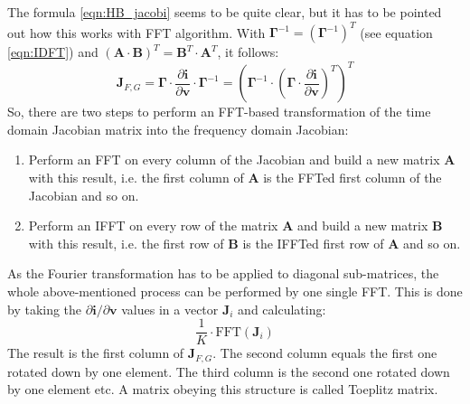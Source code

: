 The formula \ref{eqn:HB_jacobi} seems to be quite clear, but it has to be pointed out how
this works with FFT algorithm. With
$\boldsymbol{\Gamma}^{-1} = (\boldsymbol{\Gamma}^{-1})^T$
(see equation \ref{eqn:IDFT}) and
$(\boldsymbol{A}\cdot\boldsymbol{B})^T = \boldsymbol{B}^T\cdot \boldsymbol{A}^T$,
it follows:
\begin{equation}
\boldsymbol{J}_{F,G}
  = \boldsymbol{\Gamma}\cdot\frac{\partial\boldsymbol{i}}{\partial\boldsymbol{v}}
    \cdot\boldsymbol{\Gamma}^{-1}
  = \left( \boldsymbol{\Gamma}^{-1}\cdot \left( \boldsymbol{\Gamma} \cdot
    \frac{\partial\boldsymbol{i}}{\partial\boldsymbol{v}} \right)^T \right)^T
\end{equation}
So, there are two steps to perform an FFT-based transformation of the time
domain Jacobian matrix into the frequency domain Jacobian:
\begin{enumerate}
\item Perform an FFT on every column of the Jacobian and build a new matrix
      $\boldsymbol{A}$ with this result, i.e. the first column of
      $\boldsymbol{A}$ is the FFTed first column of the Jacobian and so on.
\item Perform an IFFT on every row of the matrix $\boldsymbol{A}$ and build
      a new matrix $\boldsymbol{B}$ with this result, i.e. the first row of
      $\boldsymbol{B}$ is the IFFTed first row of $\boldsymbol{A}$ and so on.
\end{enumerate}
As the Fourier transformation has to be applied to diagonal sub-matrices,
the whole above-mentioned process can be performed by one single FFT. This
is done by taking the $\partial\boldsymbol{i} / \partial\boldsymbol{v}$
values in a vector $\boldsymbol{J}_i$ and calculating:
\begin{equation}
\dfrac{1}{K}\cdot\text{FFT}\left(\boldsymbol{J}_i\right)
\end{equation}
The result is the first column of $\boldsymbol{J}_{F,G}$. The second column
equals the first one rotated down by one element. The third column is the
second one rotated down by one element etc. A matrix obeying this structure
is called Toeplitz matrix.

\addvspace{12pt}

